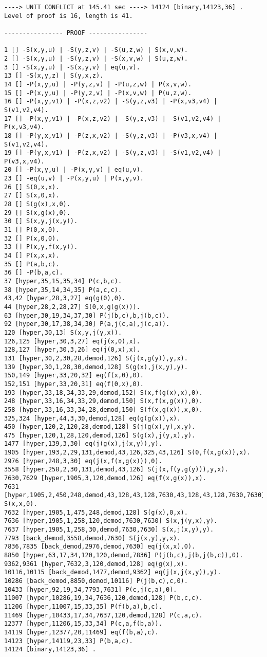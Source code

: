 {\begin{verbatim}
----> UNIT CONFLICT at 145.41 sec ----> 14124 [binary,14123,36] .
Level of proof is 16, length is 41.

---------------- PROOF ----------------

1 [] -S(x,y,u) | -S(y,z,v) | -S(u,z,w) | S(x,v,w).
2 [] -S(x,y,u) | -S(y,z,v) | -S(x,v,w) | S(u,z,w).
3 [] -S(x,y,u) | -S(x,y,v) | eq(u,v).
13 [] -S(x,y,z) | S(y,x,z).
14 [] -P(x,y,u) | -P(y,z,v) | -P(u,z,w) | P(x,v,w).
15 [] -P(x,y,u) | -P(y,z,v) | -P(x,v,w) | P(u,z,w).
16 [] -P(x,y,v1) | -P(x,z,v2) | -S(y,z,v3) | -P(x,v3,v4) | S(v1,v2,v4).
17 [] -P(x,y,v1) | -P(x,z,v2) | -S(y,z,v3) | -S(v1,v2,v4) | P(x,v3,v4).
18 [] -P(y,x,v1) | -P(z,x,v2) | -S(y,z,v3) | -P(v3,x,v4) | S(v1,v2,v4).
19 [] -P(y,x,v1) | -P(z,x,v2) | -S(y,z,v3) | -S(v1,v2,v4) | P(v3,x,v4).
20 [] -P(x,y,u) | -P(x,y,v) | eq(u,v).
23 [] -eq(u,v) | -P(x,y,u) | P(x,y,v).
26 [] S(0,x,x).
27 [] S(x,0,x).
28 [] S(g(x),x,0).
29 [] S(x,g(x),0).
30 [] S(x,y,j(x,y)).
31 [] P(0,x,0).
32 [] P(x,0,0).
33 [] P(x,y,f(x,y)).
34 [] P(x,x,x).
35 [] P(a,b,c).
36 [] -P(b,a,c).
37 [hyper,35,15,35,34] P(c,b,c).
38 [hyper,35,14,34,35] P(a,c,c).
43,42 [hyper,28,3,27] eq(g(0),0).
44 [hyper,28,2,28,27] S(0,x,g(g(x))).
63 [hyper,30,19,34,37,30] P(j(b,c),b,j(b,c)).
92 [hyper,30,17,38,34,30] P(a,j(c,a),j(c,a)).
120 [hyper,30,13] S(x,y,j(y,x)).
126,125 [hyper,30,3,27] eq(j(x,0),x).
128,127 [hyper,30,3,26] eq(j(0,x),x).
131 [hyper,30,2,30,28,demod,126] S(j(x,g(y)),y,x).
139 [hyper,30,1,28,30,demod,128] S(g(x),j(x,y),y).
150,149 [hyper,33,20,32] eq(f(x,0),0).
152,151 [hyper,33,20,31] eq(f(0,x),0).
193 [hyper,33,18,34,33,29,demod,152] S(x,f(g(x),x),0).
248 [hyper,33,16,34,33,29,demod,150] S(x,f(x,g(x)),0).
258 [hyper,33,16,33,34,28,demod,150] S(f(x,g(x)),x,0).
325,324 [hyper,44,3,30,demod,128] eq(g(g(x)),x).
450 [hyper,120,2,120,28,demod,128] S(j(g(x),y),x,y).
475 [hyper,120,1,28,120,demod,126] S(g(x),j(y,x),y).
1477 [hyper,139,3,30] eq(j(g(x),j(x,y)),y).
1905 [hyper,193,2,29,131,demod,43,126,325,43,126] S(0,f(x,g(x)),x).
2976 [hyper,248,3,30] eq(j(x,f(x,g(x))),0).
3558 [hyper,258,2,30,131,demod,43,126] S(j(x,f(y,g(y))),y,x).
7630,7629 [hyper,1905,3,120,demod,126] eq(f(x,g(x)),x).
7631 [hyper,1905,2,450,248,demod,43,128,43,128,7630,43,128,43,128,7630,7630] S(x,x,0).
7632 [hyper,1905,1,475,248,demod,128] S(g(x),0,x).
7636 [hyper,1905,1,258,120,demod,7630,7630] S(x,j(y,x),y).
7637 [hyper,1905,1,258,30,demod,7630,7630] S(x,j(x,y),y).
7793 [back_demod,3558,demod,7630] S(j(x,y),y,x).
7836,7835 [back_demod,2976,demod,7630] eq(j(x,x),0).
8850 [hyper,63,17,34,120,120,demod,7836] P(j(b,c),j(b,j(b,c)),0).
9362,9361 [hyper,7632,3,120,demod,128] eq(g(x),x).
10116,10115 [back_demod,1477,demod,9362] eq(j(x,j(x,y)),y).
10286 [back_demod,8850,demod,10116] P(j(b,c),c,0).
10433 [hyper,92,19,34,7793,7631] P(c,j(c,a),0).
11007 [hyper,10286,19,34,7636,120,demod,128] P(b,c,c).
11206 [hyper,11007,15,33,35] P(f(b,a),b,c).
11469 [hyper,10433,17,34,7637,120,demod,128] P(c,a,c).
12377 [hyper,11206,15,33,34] P(c,a,f(b,a)).
14119 [hyper,12377,20,11469] eq(f(b,a),c).
14123 [hyper,14119,23,33] P(b,a,c).
14124 [binary,14123,36] .


\end{verbatim}}
